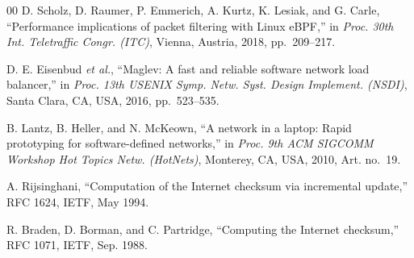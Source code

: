 \documentclass[conference]{IEEEtran}
\begin{document}
\begin{thebibliography}{00}
 D. Scholz, D. Raumer, P. Emmerich, A. Kurtz,
K. Lesiak, and G. Carle, ``Performance implications of packet filtering with
Linux eBPF,'' in \textit{Proc. 30th Int. Teletraffic Congr. (ITC)}, Vienna,
Austria, 2018, pp.~209--217.

 D. E. Eisenbud \textit{et al.}, ``Maglev: A fast
and reliable software network load balancer,'' in \textit{Proc. 13th USENIX
Symp. Netw. Syst. Design Implement. (NSDI)}, Santa Clara, CA, USA, 2016,
pp.~523--535.

 B. Lantz, B. Heller, and N. McKeown, ``A network in
a laptop: Rapid prototyping for software-defined networks,'' in \textit{Proc.
9th ACM SIGCOMM Workshop Hot Topics Netw. (HotNets)}, Monterey, CA, USA, 2010,
Art. no.~19.

 A. Rijsinghani, ``Computation of the Internet checksum via
incremental update,'' RFC 1624, IETF, May 1994.

 R. Braden, D. Borman, and C. Partridge, ``Computing the
Internet checksum,'' RFC 1071, IETF, Sep. 1988.
\end{thebibliography}
\end{document}
